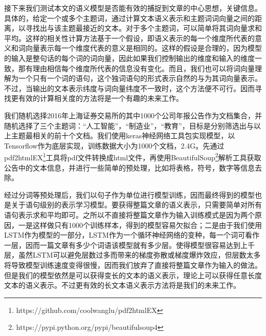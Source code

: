 \documentclass[UTF8,11pt,a4paper,nofonts]{ctexart}
\begin{document}
接下来我们测试本文的语义模型是否能有效的捕捉到文章的中心思想，关键信息。具体的，给定一个或多个主题词，通过计算文本语义表示和主题词词向量之间的距离，以寻找出与该主题最接近的文本。对于多个主题词，可以简单将其词向量求和平均。这样的相关性计算方法基于一个假设，即语义表示的每一个维度所代表的意义和词向量表示每一个维度代表的意义是相同的。这样的假设是合理的，因为模型的输入是整句话的每个词的词向量，因此如果我们控制输出的维度和输入的维度一致，那有理由相信每个维度所代表的信息没有变化。而且，我们也可以将词向量理解为一个只有一个词的语句，这个独词语句的形式表示自然的与为其词向量表示。不过，当输出的文本表示纬度与词向量纬度不一致时，这个方法便不可行。因而寻找更有效的计算相关度的方法将是一个有趣的未来工作。

我们随机选择2016年上海证券交易所的其中1000个公司年报公告作为文档集合，并随机选择了三个主题词：“人工智能”，“制造业”，“教育”，目标是分别筛选出与以上主题最相关的前十个文档。我们使用keras神经网络工具包实现模型，以Tensorflow作为底层实现，训练数据大小为1000个文档，2.4G。先通过pdf2htmlEX\footnote{https://github.com/coolwanglu/pdf2htmlEX}工具将pdf文件转换成html文件，再使用BeautifulSoup\footnote{https://pypi.python.org/pypi/beautifulsoup4}解析工具获取公告中的文本信息，并进行一些简单的预处理，比如将表格，符号，数字等信息去除。

经过分词等预处理后，我们以句子作为单位进行模型训练，因而最终得到的模型也是关于语句级别的表示学习模型。要获得整篇文章的语义表示，只需要简单对所有语句表示求和平均即可。之所以不直接将整篇文章作为输入训练模式是因为两个原因，一是这样做只有1000个训练样本，得到的模型容易欠拟合；二是由于我们使用LSTM作为模型的一部分，LSTM作为一个循环神经网络的变种，每一个词可看作一层，因而一篇文章有多少个词语该模型就有多少层。使得模型很容易达到上千层，虽然LSTM可以避免层数过多而带来的梯度弥散或梯度爆炸效应，但层数太多将导致模型训练速度变得很慢，因而我们放弃了直接将整篇文章作为输入的做法。但是我们的模型依然是可以获得变长的文本的语义表示，理论上可以获得任意长度文本的语义表示。不过更有效的长文本语义表示方法将是我们的未来工作。
\end{document}
